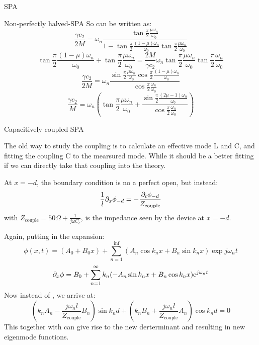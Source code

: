 \documentclass[12pt,a4paper]{article}
\begin{document}
\begin{section}{SPA}
\begin{subsection}{Non-perfectly halved-SPA}
So  can be written as: 
\begin{equation}
\frac{\gamma c_2}{2M} = \omega_n\frac{\tan{\frac{\pi}{2}\frac{\mu \omega_n}{\omega_0}}}{1-\tan{\frac{\pi}{2}\frac{(1-\mu) \omega_n}{\omega_0}}\tan{\frac{\pi}{2}\frac{\mu \omega_n}{\omega_0}}}
\end{equation}
\begin{equation}
\tan{\frac{\pi}{2}\frac{(1-\mu) \omega_n}{\omega_0}} + \tan{\frac{\pi}{2}\frac{\mu \omega_n}{\omega_0}} = \frac{2M}{\gamma c_2} \omega_n \tan{\frac{\pi}{2}\frac{\mu \omega_n}{\omega_0}}\tan{\frac{\pi}{2}\frac{\omega_n}{\omega_0}}
\end{equation}
\begin{equation}
\frac{\gamma c_2}{2M} = \omega_n\frac{\sin{\frac{\pi}{2}\frac{\mu \omega_n}{\omega_0}}\cos{\frac{\pi}{2}\frac{(1-\mu) \omega_n}{\omega_0}}}{\cos{\frac{\pi}{2}\frac{\omega_n}{\omega_0}}}
\end{equation}
\begin{equation}
\frac{\gamma c_2}{M} = \omega_n\left(\tan{\frac{\pi}{2}\frac{\mu \omega_n}{\omega_0}}+\frac{\sin{\frac{\pi}{2}\frac{(2\mu-1) \omega_n}{\omega_0}}}{\cos{\frac{\pi}{2}\frac{\omega_n}{\omega_0}}}\right)
\end{equation}
\end{subsection}


\begin{subsection}{Capacitively coupled SPA}

The old way to study the coupling is to calculate an effective mode L and C, and fitting the coupling C to the mearsured mode. 
While it should be a better fitting if we can directly take that coupling into the theory.

At $x=-d$, the boundary condition is no a perfect open, but instead: 
\begin{equation}
\frac{1}{l}\partial_x\phi_{-d} = -\frac{\partial_t\phi_{-d}}{Z_\mathrm{couple}}
\end{equation}
with $Z_\mathrm{couple} = 50\Omega + \frac{1}{j\omega C_c}$, is the impedance seen by the device at $x=-d$. 

Again, putting in the expansion: 
\begin{equation}
\phi(x,t) = (A_0 + B_0 x) + \sum_{n=1}^\inf{(A_n \cos k_n x + B_n \sin k_n x)\exp{j\omega_n t}} 
\end{equation}
\begin{equation}\label{eq:x<0}
\partial_x \phi  = B_0 + \sum_{n=1}^\infty{ k_n ( - A_n \sin k_n x  + B_n \cos k_n x)\mathrm{e}^{j\omega_n t}} 
\end{equation}
Now instead of , we arrive at:
\begin{equation}\label{eq:1''}
\left(k_n A_n - \frac{j\omega_n l}{Z_\mathrm{couple}}B_n\right) \sin{k_n d} + \left(k_n B_n + \frac{j\omega_n l}{Z_\mathrm{couple}}A_n\right) \cos{k_n d} = 0
\end{equation}
This together with  can give rise to the new derterminant and resulting in new eigenmode functions. 


\end{subsection}
\end{section}
\end{document}
